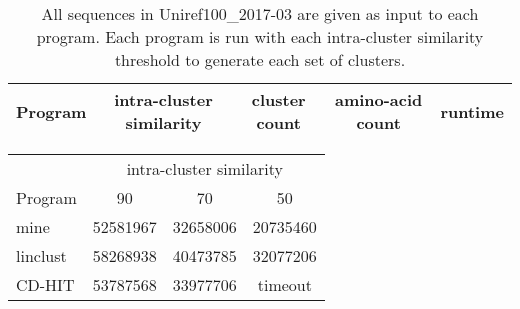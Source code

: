 \documentclass[]{article}
\begin{document}
\begin{table}%
	\centering
	\caption{
		All sequences in Uniref100\_2017-03 are given as input to each program. 
		Each program is run with each intra-cluster similarity threshold to generate each set of clusters.
	}
	\begin{tabular}{l c c c c}
		\toprule
		Program & intra-cluster similarity & cluster count & amino-acid count & runtime \\
		\midrule
		
		
		\bottomrule
	\end{tabular}
\end{table}

\begin{table}%
\centering
\begin{tabular}{l c c c}
\toprule
        & \multicolumn{3}{c}{intra-cluster similarity} \\
Program & 90 & 70 & 50 \\
\midrule
mine & 52581967 & 32658006 & 20735460 \\
linclust & 58268938 & 40473785 & 32077206 \\
CD-HIT & 53787568 & 33977706 & timeout \\
\bottomrule
\end{tabular}
\end{table}


%


\end{document}
